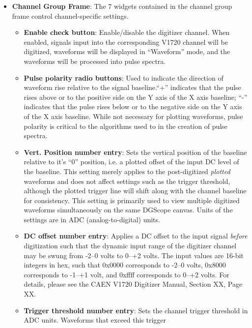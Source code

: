 \begin{itemize}
  \item{\textbf{Channel Group Frame}: The 7 widgets contained in the
    channel group frame control channel-specific settings.
    \begin{itemize}
      \item{\textbf{Enable check button}: Enable/disable the digitizer
        channel. When enabled, signals input into the corresponding
        V1720 channel will be digitized, waveforms will be displayed
        in ``Waveform'' mode, and the waveforms will be processed into
        pulse spectra.}
      \item{\textbf{Pulse polarity radio buttons}: Used to indicate
        the direction of waveform rise relative to the signal
        baseline.``+'' indicates that the pulse rises above or to the
        positive side on the Y axis of the X axis baseline; ``-''
        indicates that the pulse rises below or to the negative side
        on the Y axis of the X axis baseline. While not necessary for
        plotting waveforms, pulse polarity is critical to the
        algorithms used to in the creation of pulse spectra.}
      \item{\textbf{Vert. Position number entry}: Sets the vertical
        position of the baseline relative to it's ``0'' position,
        i.e. a plotted offset of the input DC level of the
        baseline. This setting merely applies to the post-digitized
        \textit{plotted} waveforms and does not affect settings such
        as the trigger threshold, although the plotted trigger line
        will shift along with the channel baseline for
        consistency. This setting is primarily used to view multiple
        digitized waveforms simultaneously on the same DGScope
        canvas. Units of the settings are in ADC (analog-to-digital)
        units.}
      \item{\textbf{DC offset number entry}: Applies a DC offset to
        the input signal \textit{before} digitization such that the
        dynamic input range of the digitizer channel may be swung from
        -2--0 volts to 0--+2 volts. The input values are 16-bit
        integers in hex, such that 0x0000 corresponds to -2--0 volts,
        0x8000 corresponds to -1--+1 volt, and 0xffff corresponds to
        0--+2 volts. For details, please see the CAEN V1720 Digitizer
        Manual, Section XX, Page XX.}
      \item{\textbf{Trigger threshold number entry}: Sets the channel trigger
        threshold in ADC units. Waveforms that exceed this trigger
}
\end{itemize}}
\end{itemize}
